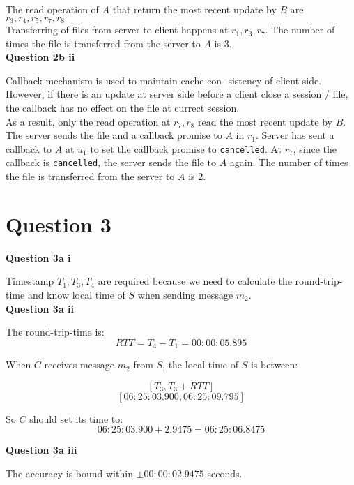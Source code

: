 \documentclass[11pt,a4paper]{report}
\begin{document}
\begin{multicols*}{2}
\noindent The read operation of $A$ that return the most recent update by $B$ are $r_3,r_4,r_5,r_7,r_8$\\

\noindent Transferring of files from server to client happens at $r_1,r_3,r_7$. The number of times the file is transferred from the server to $A$ is 3.\\

\noindent \textbf{Question 2b ii}

\noindent Callback mechanism is used to maintain cache con- sistency of client side. However, if there is an update at server side before a client close a session / file, the callback has no effect on the file at currect session. \\

\noindent As a result, only the read operation at $r_7,r_8$ read the most recent update by $B$. \\

\noindent The server sends the file and a callback promise to $A$ in $r_1$. Server has sent a callback to $A$ at $u_1$ to set the callback promise to \verb|cancelled|. At $r_7$, since the callback is \verb|cancelled|, the server sends the file to $A$ again. The number of times the file is transferred from the server to $A$ is 2.

\section{Question 3}

\noindent \textbf{Question 3a i}

\noindent Timestamp $T_1,T_3,T_4$ are required because we need to calculate the round-trip-time and know local time of $S$ when sending message $m_2$.\\

\noindent \textbf{Question 3a ii}

\noindent The round-trip-time is:
$$RTT = T_4 - T_1 = 00:00:05.895$$

\noindent When $C$ receives message $m_2$ from $S$, the local time of $S$ is between:

$$[T_3, T_3+RTT]$$
$$[06:25:03.900, 06:25:09.795]$$

\noindent So $C$ should set its time to:
$$06:25:03.900 + 2.9475 = 06:25:06.8475$$

\noindent \textbf{Question 3a iii}

\noindent The accuracy is bound within $\pm 00:00:02.9475$ seconds.\\


\end{multicols*}
\end{document}
